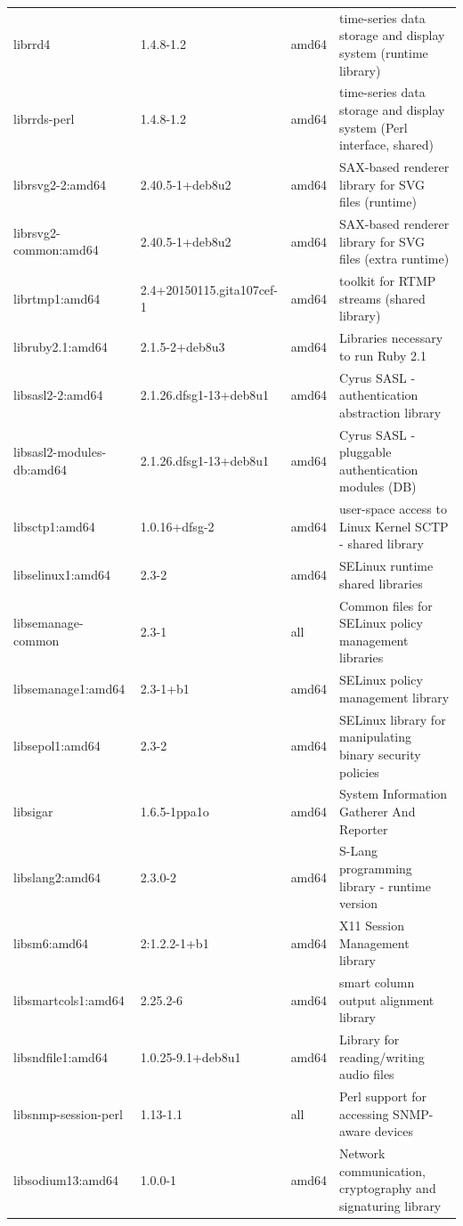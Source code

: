 \documentclass[a4paper,10pt]{article}
\begin{document}
\begin{appendices}
{\begin{longtable}{p{3.25cm}@{\hspace{0.25cm}}p{4cm}@{\hspace{0.25cm}}l@{\hspace{0.25cm}}p{7cm}}
librrd4	&	1.4.8-1.2	&	amd64	&	time-series data storage and display system (runtime library)	\\
librrds-perl	&	1.4.8-1.2	&	amd64	&	time-series data storage and display system (Perl interface, shared)	\\
librsvg2-2:amd64	&	2.40.5-1+deb8u2	&	amd64	&	SAX-based renderer library for SVG files (runtime)	\\
librsvg2-common:amd64	&	2.40.5-1+deb8u2	&	amd64	&	SAX-based renderer library for SVG files (extra runtime)	\\
librtmp1:amd64	&	2.4+20150115.gita107cef-1	&	amd64	&	toolkit for RTMP streams (shared library)	\\
libruby2.1:amd64	&	2.1.5-2+deb8u3	&	amd64	&	Libraries necessary to run Ruby 2.1	\\
libsasl2-2:amd64	&	2.1.26.dfsg1-13+deb8u1	&	amd64	&	Cyrus SASL - authentication abstraction library	\\
libsasl2-modules-db:amd64	&	2.1.26.dfsg1-13+deb8u1	&	amd64	&	Cyrus SASL - pluggable authentication modules (DB)	\\
libsctp1:amd64	&	1.0.16+dfsg-2	&	amd64	&	user-space access to Linux Kernel SCTP - shared library	\\
libselinux1:amd64	&	2.3-2	&	amd64	&	SELinux runtime shared libraries	\\
libsemanage-common	&	2.3-1	&	all	&	Common files for SELinux policy management libraries	\\
libsemanage1:amd64	&	2.3-1+b1	&	amd64	&	SELinux policy management library	\\
libsepol1:amd64	&	2.3-2	&	amd64	&	SELinux library for manipulating binary security policies	\\
libsigar	&	1.6.5-1ppa1o	&	amd64	&	System Information Gatherer And Reporter	\\
libslang2:amd64	&	2.3.0-2	&	amd64	&	S-Lang programming library - runtime version	\\
libsm6:amd64	&	2:1.2.2-1+b1	&	amd64	&	X11 Session Management library	\\
libsmartcols1:amd64	&	2.25.2-6	&	amd64	&	smart column output alignment library	\\
libsndfile1:amd64	&	1.0.25-9.1+deb8u1	&	amd64	&	Library for reading/writing audio files	\\
libsnmp-session-perl	&	1.13-1.1	&	all	&	Perl support for accessing SNMP-aware devices	\\
libsodium13:amd64	&	1.0.0-1	&	amd64	&	Network communication, cryptography and signaturing library	\\

\end{longtable}}
\end{appendices}
\end{document}
